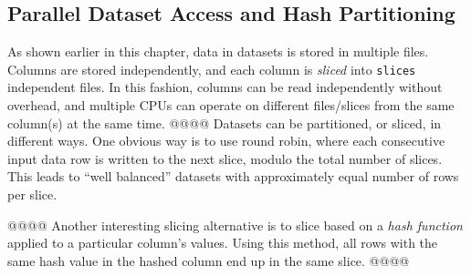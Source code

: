 




\subsection{Parallel Dataset Access and Hash Partitioning}
As shown earlier in this chapter, data in datasets is stored in
multiple files.  Columns are stored independently, and each column is
\textsl{sliced} into \texttt{slices} independent files.  In this
fashion, columns can be read independently without overhead, and
multiple CPUs can operate on different files/slices from the same
column(s) at the same time.
@@@@
Datasets can be partitioned, or sliced, in different ways.  One
obvious way is to use round robin, where each consecutive input data
row is written to the next slice, modulo the total number of slices.
This leads to ``well balanced'' datasets with approximately equal
number of rows per slice.

@@@@
Another interesting slicing alternative is
to slice based on a \textsl{hash function} applied to a particular
column's values.  Using this method, all rows with the same hash value
in the hashed column end up in the same slice.
@@@@



